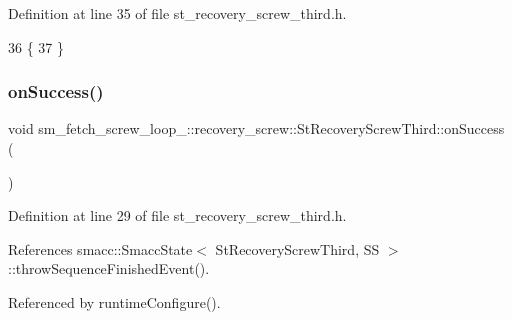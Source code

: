 Definition at line 35 of file st\+\_\+recovery\+\_\+screw\+\_\+third.\+h.


\begin{DoxyCode}
36             \{
37             \}
\end{DoxyCode}
\mbox{\label{structsm__fetch__screw__loop__1_1_1recovery__screw_1_1StRecoveryScrewThird_ad2d8eab6f798eff92197acb3242a5860}} 
\subsubsection{\texorpdfstring{on\+Success()}{onSuccess()}}
{\footnotesize\ttfamily void sm\+\_\+fetch\+\_\+screw\+\_\+loop\+\_\+::recovery\+\_\+screw\+::\+St\+Recovery\+Screw\+Third\+::on\+Success (\begin{DoxyParamCaption}{ }\end{DoxyParamCaption})\hspace{0.3cm}{\ttfamily [inline]}}



Definition at line 29 of file st\+\_\+recovery\+\_\+screw\+\_\+third.\+h.



References smacc\+::\+Smacc\+State$<$ St\+Recovery\+Screw\+Third, S\+S $>$\+::throw\+Sequence\+Finished\+Event().



Referenced by runtime\+Configure().


